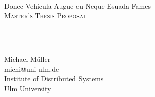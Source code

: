 {
	\parindent0pt
	\ \\ \ \\ \ \\

	\hrulefill
	\vspace{0.0cm}
	\begin{spacing}{2.1}
	{	
		\flushleft
		\fontsize{22pt}{44pt}\selectfont 
		Donec Vehicula Augue eu Neque Esuada Fames 
	}\\
	\textsc{Master's Thesis Proposal}
	\end{spacing}

	\ \\ \ \\
	{
		Michael M\"uller\\
		michi@uni-ulm.de\\
		Institute of Distributed Systems\\
		Ulm University\par
	}
	\ \\

	\hrulefill

}
